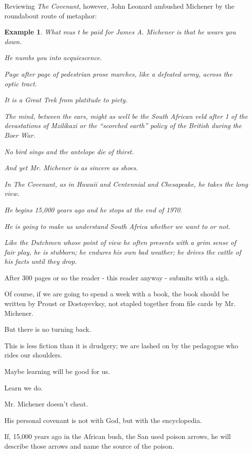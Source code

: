 \documentclass{book}
\numberwithin{equation}{section}
\newtheorem{example}{Example}[chapter]
\begin{document}
Reviewing \textit{The Covenant}, however, John Leonard ambushed Michener by the roundabout route of metaphor:
\begin{example}
    What mus t be paid for James A. Michener is that he wears you down.
    
    He numbs you into acquiescence.
    
    Page after page of pedestrian prose marches, like a defeated army, across the optic tract.
    
    It is a Great Trek from platitude to piety.
    
    The mind, between the ears, might as well be the South African veld after 1 of the devastations of Mzilikazi or the ``scorched earth'' policy of the British during the Boer War.
    
    No bird sings and the antelope die of thirst.
    
    And yet Mr. Michener is as sincere as shoes.
    
    In \emph{The Covenant}, as in \emph{Hawaii} and \emph{Centennial} and \emph{Chesapeake}, he takes the long view.
    
    He begins 15,000 years ago and he stops at the end of 1970.
    
    He is going to make us understand South Africa whether we want to or not.
    
    Like the Dutchmen whose point of view he often presents with a grim sense of fair play, he is stubborn; he endures his own bad weather; he drives the cattle of his facts until they drop.
\end{example}
After 300 pages or so the reader - this reader anyway - submits with a sigh.

Of course, if we are going to spend a week with a book, the book should be written by Proust or Dostoyevksy, not stapled together from file cards by Mr. Michener.

But there is no turning back.

This is less fiction than it is drudgery; we are lashed on by the pedagogue who rides our shoulders.

Maybe learning will be good for us.

%
Learn we do.

Mr. Michener doesn't cheat.

His personal covenant is not with God, but with the encyclopedia.

If, 15,000 years ago in the African bush, the San used poison arrows, he will describe those arrows and name the source of the poison.
\end{document}
